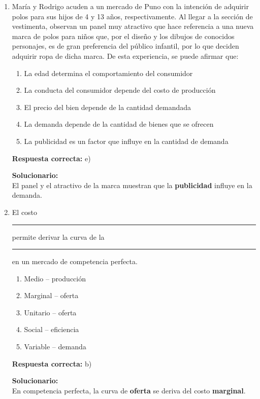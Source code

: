 \begin{enumerate}

	
	\item María y Rodrigo acuden a un mercado de Puno con la intención de adquirir polos para sus hijos de 4 y 13 años, respectivamente. Al llegar a la sección de vestimenta, observan un panel muy atractivo que hace referencia a una nueva marca de polos para niños que, por el diseño y los dibujos de conocidos personajes, es de gran preferencia del público infantil, por lo que deciden adquirir ropa de dicha marca. De esta experiencia, se puede afirmar que:
	\begin{enumerate}[label=\alph*)]
		\item La edad determina el comportamiento del consumidor
		\item La conducta del consumidor depende del costo de producción
		\item El precio del bien depende de la cantidad demandada
		\item La demanda depende de la cantidad de bienes que se ofrecen
		\item La publicidad es un factor que influye en la cantidad de demanda
	\end{enumerate}
	\textbf{Respuesta correcta:} e)
	
	\vspace{2mm}
	\textbf{Solucionario:}\\
	El panel y el atractivo de la marca muestran que la \textbf{publicidad} influye en la demanda.
	
	\vspace{6mm}
	
	\item El costo \rule{2cm}{0.4pt} permite derivar la curva de la \rule{2cm}{0.4pt} en un mercado de competencia perfecta.
	\begin{enumerate}[label=\alph*)]
		\item Medio – producción
		\item Marginal – oferta
		\item Unitario – oferta
		\item Social – eficiencia
		\item Variable – demanda
	\end{enumerate}
	\textbf{Respuesta correcta:} b)
	
	\vspace{2mm}
	\textbf{Solucionario:}\\
	En competencia perfecta, la curva de \textbf{oferta} se deriva del costo \textbf{marginal}.
	

\end{enumerate}
